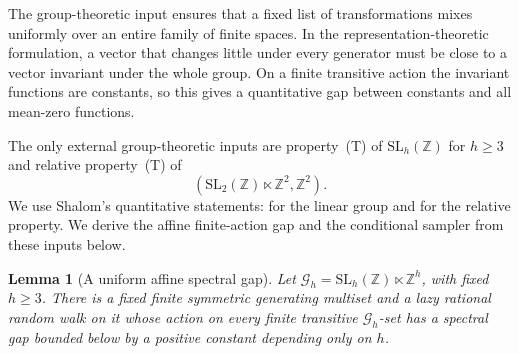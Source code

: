 \documentclass[11pt]{article}
\numberwithin{equation}{section}
\newtheorem{lemma}[theorem]{Lemma}
\theoremstyle{definition}
\theoremstyle{remark}
\begin{document}
The group-theoretic input ensures that a fixed list of transformations mixes uniformly over an entire family of finite spaces. In the representation-theoretic formulation, a vector that changes little under every generator must be close to a vector invariant under the whole group. On a finite transitive action the invariant functions are constants, so this gives a quantitative gap between constants and all mean-zero functions.

The only external group-theoretic inputs are property~(T) of
$\mathrm{SL}_{h}(\mathbb Z)$ for ${h}\ge3$ and relative property~(T) of
\[
(\mathrm{SL}_2(\mathbb Z)\ltimes\mathbb Z^2,\mathbb Z^2).
\]
We use Shalom's quantitative statements:
\cite[Theorem~2.6, p.~156]{Shalom1999} for the linear group and
\cite[Theorem~2.1, p.~152]{Shalom1999} for the relative property.
We derive the affine finite-action gap and the conditional sampler from
these inputs below.

\begin{lemma}[A uniform affine spectral gap]\label{lem:env-affine}
Let
${\mathcal{G}}_{h}=\mathrm{SL}_{h}(\mathbb Z)\ltimes\mathbb Z^{h}$, with fixed
${h}\ge3$. There is a fixed finite symmetric generating multiset and a
lazy rational random walk on it whose action on every finite transitive
${\mathcal{G}}_{h}$-set has a spectral gap bounded below by a positive constant
depending only on ${h}$.
\end{lemma}
\end{document}
